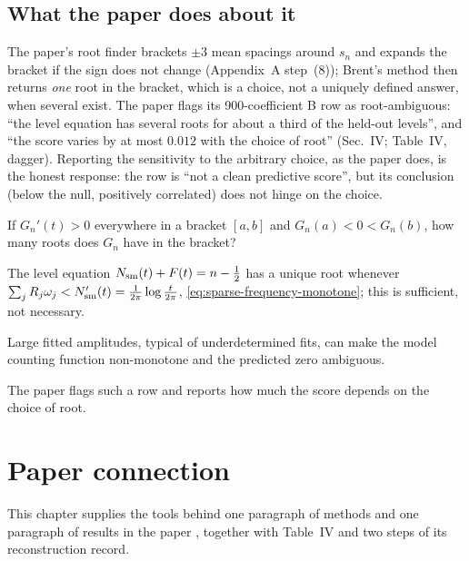 \subsection{What the paper does about it}

The paper's root finder brackets $\pm3$ mean spacings around $s_n$ and expands the bracket if the sign does not change (Appendix~A step~(8)); Brent's method then returns \emph{one} root in the bracket, which is a choice, not a uniquely defined answer, when several exist. The paper flags its 900-coefficient B row as root-ambiguous: ``the level equation has several roots for about a third of the held-out levels'', and ``the score varies by at most $0.012$ with the choice of root'' (Sec.~IV; Table~IV, dagger). Reporting the sensitivity to the arbitrary choice, as the paper does, is the honest response: the row is ``not a clean predictive score'', but its conclusion (below the null, positively correlated) does not hinge on the choice.

\begin{checkpoint}
If $G_n'(t)>0$ everywhere in a bracket $[a,b]$ and $G_n(a)<0<G_n(b)$, how many roots does $G_n$ have in the bracket?
\end{checkpoint}

\begin{keyideas}
\item The level equation $N_{\mathrm{sm}}(t)+F(t)=n-\tfrac12$ has a unique root whenever $\sum_jR_j\omega_j<N_{\mathrm{sm}}'(t)=\frac1{2\pi}\log\frac{t}{2\pi}$, \eqref{eq:sparse-frequency-monotone}; this is sufficient, not necessary.
\item Large fitted amplitudes, typical of underdetermined fits, can make the model counting function non-monotone and the predicted zero ambiguous.
\item The paper flags such a row and reports how much the score depends on the choice of root.
\end{keyideas}

\section{Paper connection}\label{sec:sparse-frequency-paper}

This chapter supplies the tools behind one paragraph of methods and one paragraph of results in the paper \cite{soniR1}, together with Table~IV and two steps of its reconstruction record.

